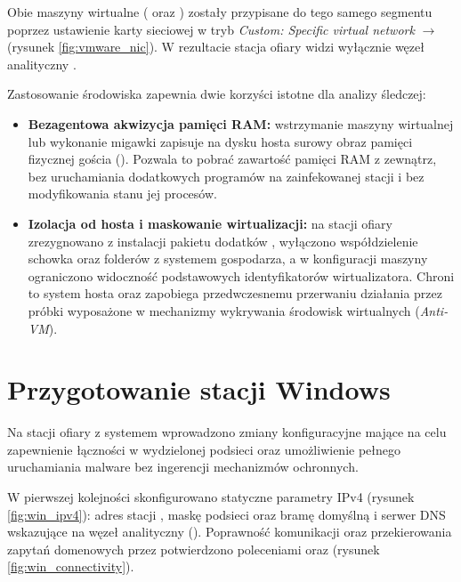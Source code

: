 
Obie maszyny wirtualne ( oraz ) zostały przypisane do tego samego segmentu poprzez ustawienie karty sieciowej w tryb \textit{Custom: Specific virtual network} $\rightarrow$  (rysunek \ref{fig:vmware_nic}). W rezultacie stacja ofiary widzi wyłącznie węzeł analityczny .


Zastosowanie środowiska  zapewnia dwie korzyści istotne dla analizy śledczej:
\begin{itemize}
    \item \textbf{Bezagentowa akwizycja pamięci RAM:} wstrzymanie maszyny wirtualnej lub wykonanie migawki zapisuje na dysku hosta surowy obraz pamięci fizycznej gościa (). Pozwala to pobrać zawartość pamięci RAM z zewnątrz, bez uruchamiania dodatkowych programów na zainfekowanej stacji i bez modyfikowania stanu jej procesów.
    \item \textbf{Izolacja od hosta i maskowanie wirtualizacji:} na stacji ofiary zrezygnowano z instalacji pakietu dodatków , wyłączono współdzielenie schowka oraz folderów z systemem gospodarza, a w konfiguracji maszyny ograniczono widoczność podstawowych identyfikatorów wirtualizatora. Chroni to system hosta oraz zapobiega przedwczesnemu przerwaniu działania przez próbki wyposażone w mechanizmy wykrywania środowisk wirtualnych (\textit{Anti-VM}).
\end{itemize}

\section{Przygotowanie stacji Windows}\label{sec:konfiguracja_windows}

Na stacji ofiary z systemem  wprowadzono zmiany konfiguracyjne mające na celu zapewnienie łączności w wydzielonej podsieci oraz umożliwienie pełnego uruchamiania malware bez ingerencji mechanizmów ochronnych.

W pierwszej kolejności skonfigurowano statyczne parametry IPv4 (rysunek \ref{fig:win_ipv4}): adres stacji , maskę podsieci  oraz bramę domyślną i serwer DNS wskazujące na węzeł analityczny  (). Poprawność komunikacji oraz przekierowania zapytań domenowych przez  potwierdzono poleceniami  oraz  (rysunek \ref{fig:win_connectivity}).

